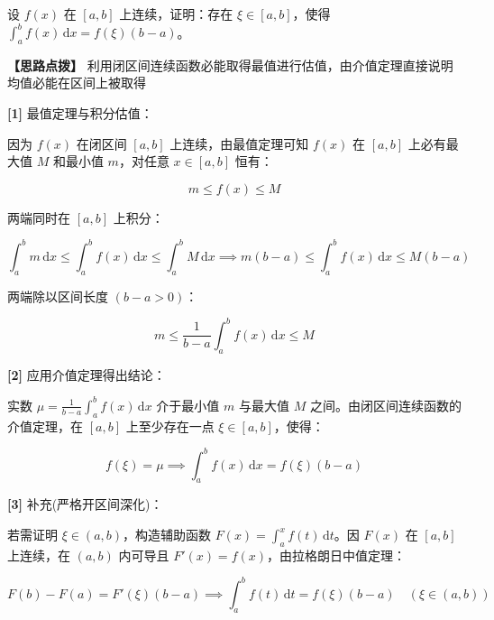\documentclass[11pt,a4paper,UTF8]{ctexart}
\begin{document}
设 $f(x)$ 在 $[a, b]$ 上连续，证明：存在 $\xi \in [a, b]$，使得 $\int_a^b f(x)\,\mathrm{d}x = f(\xi)(b-a)$。

\textbf{\color{DeepPurple}【思路点拨】} 利用闭区间连续函数必能取得最值进行估值，由介值定理直接说明均值必能在区间上被取得


\begin{solbox}[分步推导与答题规范]
\textbf{[1]} 最值定理与积分估值：

因为 $f(x)$ 在闭区间 $[a, b]$ 上连续，由最值定理可知 $f(x)$ 在 $[a, b]$ 上必有最大值 $M$ 和最小值 $m$，对任意 $x \in [a, b]$ 恒有：


\begin{equation*}
m \leqslant f(x) \leqslant M
\end{equation*}


两端同时在 $[a, b]$ 上积分：


\begin{equation*}
\int_a^b m\,\mathrm{d}x \leqslant \int_a^b f(x)\,\mathrm{d}x \leqslant \int_a^b M\,\mathrm{d}x \implies m(b-a) \leqslant \int_a^b f(x)\,\mathrm{d}x \leqslant M(b-a)
\end{equation*}


两端除以区间长度 $(b-a > 0)$：


\begin{equation*}
m \leqslant \frac{1}{b-a}\int_a^b f(x)\,\mathrm{d}x \leqslant M
\end{equation*}


\textbf{[2]} 应用介值定理得出结论：

实数 $\mu = \frac{1}{b-a}\int_a^b f(x)\,\mathrm{d}x$ 介于最小值 $m$ 与最大值 $M$ 之间。由闭区间连续函数的介值定理，在 $[a, b]$ 上至少存在一点 $\xi \in [a, b]$，使得：


\begin{equation*}
f(\xi) = \mu \implies \int_a^b f(x)\,\mathrm{d}x = f(\xi)(b-a)
\end{equation*}


\textbf{[3]} 补充(严格开区间深化)：

若需证明 $\xi \in (a, b)$，构造辅助函数 $F(x) = \int_a^x f(t)\,\mathrm{d}t$。因 $F(x)$ 在 $[a, b]$ 上连续，在 $(a, b)$ 内可导且 $F'(x) = f(x)$，由拉格朗日中值定理：


\begin{equation*}
F(b) - F(a) = F'(\xi)(b-a) \implies \int_a^b f(t)\,\mathrm{d}t = f(\xi)(b-a) \quad (\xi \in (a, b))
\end{equation*}

\end{solbox}
\end{document}
